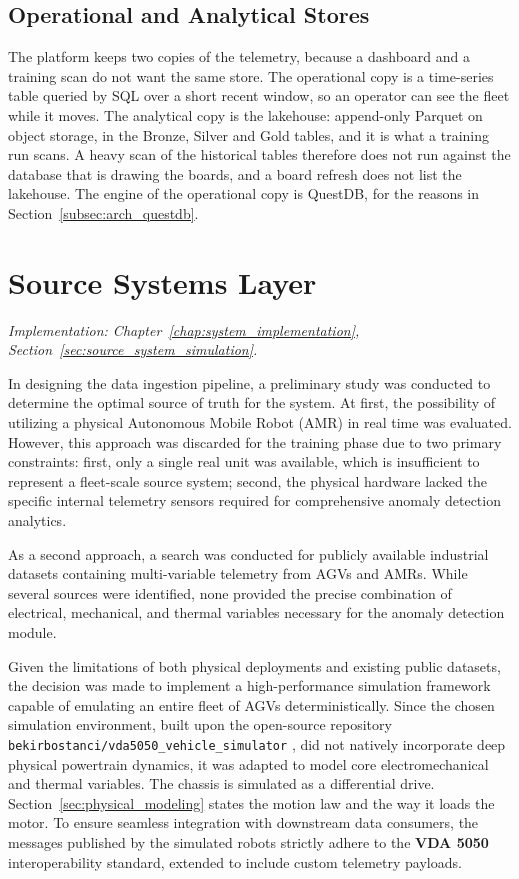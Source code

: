 \subsection{Operational and Analytical Stores}
\label{subsec:bifurcated-storage}

The platform keeps two copies of the telemetry, because a dashboard and a training scan do not want the same store. The operational copy is a time-series table queried by SQL over a short recent window, so an operator can see the fleet while it moves. The analytical copy is the lakehouse: append-only Parquet on object storage, in the Bronze, Silver and Gold tables, and it is what a training run scans. A heavy scan of the historical tables therefore does not run against the database that is drawing the boards, and a board refresh does not list the lakehouse. The engine of the operational copy is QuestDB, for the reasons in Section~\ref{subsec:arch_questdb}.

\section{Source Systems Layer}
\label{sec:arch_source_systems}
\textit{Implementation: Chapter~\ref{chap:system_implementation}, Section~\ref{sec:source_system_simulation}.}

In designing the data ingestion pipeline, a preliminary study was conducted to determine the optimal source of truth for the system.
At first, the possibility of utilizing a physical Autonomous Mobile Robot (AMR) in real time was evaluated.
However, this approach was discarded for the training phase due to two primary constraints: first, only a single real unit was available, which is insufficient to represent a fleet-scale source system; second, the physical hardware lacked the specific internal telemetry sensors required for comprehensive anomaly detection analytics.

As a second approach, a search was conducted for publicly available industrial datasets containing multi-variable telemetry from AGVs and AMRs.
While several sources were identified, none provided the precise combination of electrical, mechanical, and thermal variables necessary for the anomaly detection module.

Given the limitations of both physical deployments and existing public datasets, the decision was made to implement a high-performance simulation framework capable of emulating an entire fleet of AGVs deterministically.
Since the chosen simulation environment, built upon the open-source repository \texttt{bekirbostanci/vda5050\_vehicle\_simulator} \cite{bostanciVda5050}, did not natively incorporate deep physical powertrain dynamics, it was adapted to model core electromechanical and thermal variables. The chassis is simulated as a differential drive. Section~\ref{sec:physical_modeling} states the motion law and the way it loads the motor.
To ensure seamless integration with downstream data consumers, the messages published by the simulated robots strictly adhere to the \textbf{VDA 5050} \cite{vda5050standard} interoperability standard, extended to include custom telemetry payloads.

